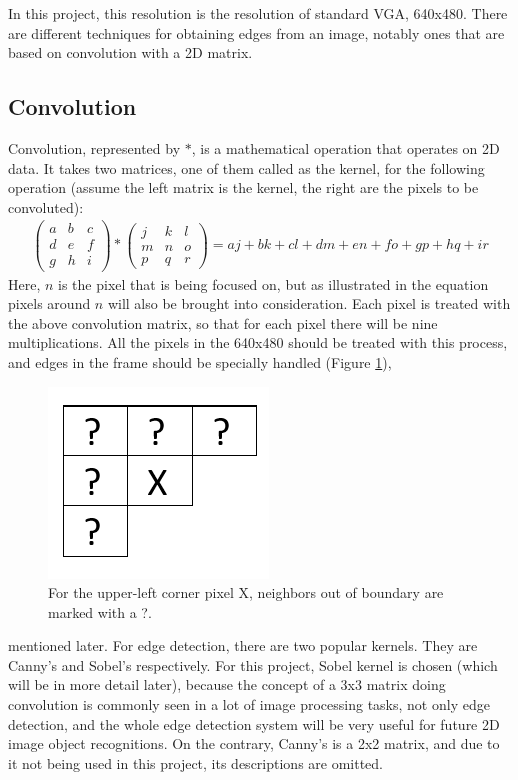 \documentclass{article}
\begin{document}
	In this project, this resolution is the resolution of standard VGA, 640x480. There are different techniques for obtaining edges from an image, notably ones that are based on convolution with a 2D matrix.
	
	\subsection{Convolution}
		Convolution, represented by $*$, is a mathematical operation that operates on 2D data. It takes two matrices, one of them called as the kernel, for the following operation (assume the left matrix is the kernel, the right are the pixels to be convoluted):
		\begin{align*}
			\begin{pmatrix}
				a&b&c\\
				d&e&f\\
				g&h&i
			\end{pmatrix} * 
			\begin{pmatrix}
				j&k&l\\
				m&n&o\\
				p&q&r
			\end{pmatrix}=
			aj+bk+cl+dm+en+fo+gp+hq+ir
		\end{align*}
		Here, $n$ is the pixel that is being focused on, but as illustrated in the equation pixels around $n$ will also be brought into consideration. Each pixel is treated with the above convolution matrix, so that for each pixel there will be nine multiplications. All the pixels in the 640x480 should be treated with this process, and edges in the frame should be specially handled (Figure \ref{fig:boundary}),
	\begin{figure}[h]
		\centering
		\includegraphics[scale=0.9]{boundary}
		\caption{For the upper-left corner pixel X, neighbors out of boundary are marked with a ?.}
		\label{fig:boundary}
	\end{figure} mentioned later.
		For edge detection, there are two popular kernels. They are Canny's and Sobel's respectively. For this project, Sobel kernel is chosen (which will be in more detail later), because the concept of a 3x3 matrix doing convolution is commonly seen in a lot of image processing tasks, not only edge detection, and the whole edge detection system will be very useful for future 2D image object recognitions. On the contrary, Canny's is a 2x2 matrix, and due to it not being used in this project, its descriptions are omitted.
	\\
		
\end{document}
